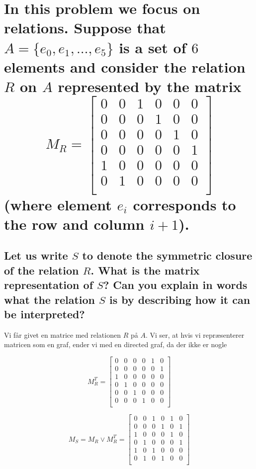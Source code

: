 \documentclass[a4paper,12pt]{article}
\begin{document}
\section[Question 4]{In this problem we focus on relations. Suppose that $A = \{e_0,e_1,\dots,e_5\}$ is a set of
$6$ elements and consider the relation $R$ on $A$ represented by the matrix
\[M_R = 
    \begin{bmatrix}
        0 & 0 & 1 & 0 & 0 & 0 \\
        0 & 0 & 0 & 1 & 0 & 0 \\
        0 & 0 & 0 & 0 & 1 & 0 \\
        0 & 0 & 0 & 0 & 0 & 1 \\
        1 & 0 & 0 & 0 & 0 & 0 \\
        0 & 1 & 0 & 0 & 0 & 0 \\
    \end{bmatrix}
\]
(where element $e_i$ corresponds to the row and column $i+1$).}
\subsection[]{Let us write $S$ to denote the symmetric closure of the relation $R$. 
What is the matrix representation of $S$? Can you explain in words what the relation $S$ is by describing how it can be interpreted?
}

Vi får givet en matrice med relationen $R$ på $A$. Vi ser, at hvis vi repræsenterer matricen som en graf, ender vi med en directed graf, da der ikke er nogle 

\[M_{R}^T = 
    \begin{bmatrix}
        0 & 0 & 0 & 0 & 1 & 0 \\
        0 & 0 & 0 & 0 & 0 & 1 \\
        1 & 0 & 0 & 0 & 0 & 0 \\
        0 & 1 & 0 & 0 & 0 & 0 \\
        0 & 0 & 1 & 0 & 0 & 0 \\
        0 & 0 & 0 & 1 & 0 & 0 \\
    \end{bmatrix}
\]


\[M_S = M_R \lor M_{R}^T = 
    \begin{bmatrix}
        0 & 0 & 1 & 0 & 1 & 0 \\
        0 & 0 & 0 & 1 & 0 & 1 \\
        1 & 0 & 0 & 0 & 1 & 0 \\
        0 & 1 & 0 & 0 & 0 & 1 \\
        1 & 0 & 1 & 0 & 0 & 0 \\
        0 & 1 & 0 & 1 & 0 & 0 \\
    \end{bmatrix}
\]
\end{document}

